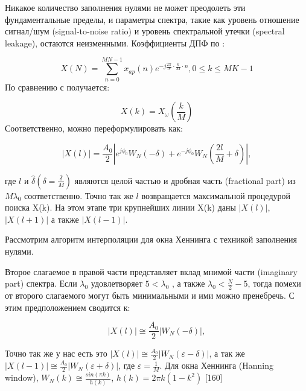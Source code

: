 Никакое количество заполнения нулями не может преодолеть эти фундаментальные пределы, и параметры спектра, такие как уровень отношение сигнал/шум (signal-to-noise ratio) и уровень спектральной утечки (spectral leakage), остаются неизменными. Коэффициенты ДПФ по :

\begin{equation}
\label{eq:equation22}
X(N)= \sum_{n=0}^{MN-1} x_{ap}(n) e^{-j \frac{2 \pi}{N}\cdot \frac{k}{M} \cdot n}, 0\leq k \leq MK-1
\end{equation}
По сравнению с  получается:

\begin{equation}
\label{eq:equation23}
X(k)= X_\omega \left( {\frac{k}{M}}\right)  \end{equation}
Соответственно,  можно переформулировать как:

\begin{equation}
\label{eq:equation24}
\left| {X(l)} \right|   = \frac{A_0}{2}\left| {e^{j\phi_0}W_N(-\delta)+e^{-j\phi_0}W_N \left(\frac{2l}{M}+\delta \right)} \right|,
\end{equation}

где $l$ и $\hat{\delta}
\left( {\delta= \frac{\hat{\delta}}{M}}\right) $
являются целой частью и дробная часть (fractional part) из $M\lambda_0$ соответственно. Точно так же $l$ возвращается максимальной процедурой поиска X(k). На этом этапе три крупнейших линии X(k) даны $\left| {X(l)} \right|$,$\left| {X(l+1)} \right|$ а также $\left|{X(l-1)}\right|$.

Рассмотрим алгоритм интерполяции для окна Хеннинга с техникой заполнения нулями.

Второе слагаемое в правой части  представляет вклад мнимой части (imaginary part) спектра. Если $\lambda_0$ удовлетворяет $5<\lambda_0$ , а также $\lambda_0 < \frac{N}{2}-5$, тогда помехи от второго слагаемого могут быть минимальными и ими можно пренебречь. С этим предположением  сводится к:

\begin{equation}
\label{eq:equation25}
\left| {X(l)} \right| \cong \frac{A_0}{2}\left| {W_N(-\delta)} \right|,
\end{equation}

Точно так же у нас есть это $\left| {X(l)} \right| \cong \frac{A_0}{2}\left| {W_N(\varepsilon -\delta)} \right|$, а так же $\left| {X(l-1)} \right| \cong \frac{A_0}{2} \left| {W_N(\varepsilon +\delta)} \right|$, где $\varepsilon=\frac{1}{M}$. Для окна Хеннинга (Hanning window), $W_N (k) \cong \frac{sin(\pi k)}{h(k)}$,
$h(k) = 2 \pi k (1-k^2)$ [160]

